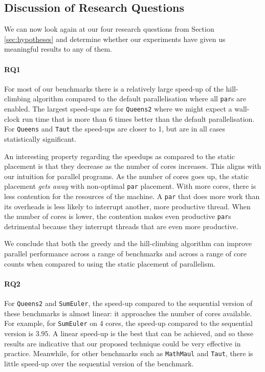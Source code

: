 \subsection{Discussion of Research Questions}

We can now look again at our four research questions from Section
\ref{sec:hypotheses} and determine whether our experiments have given us
meaningful results to any of them.

\paragraph{RQ1}
For most of our benchmarks there is a relatively large speed-up of the
hill-climbing algorithm compared to the default parallelisation where all
\verb-par-s are enabled.  The largest speed-ups are for \verb|Queens2| where we
might expect a wall-clock run time that is more than 6 times better than the
default parallelisation.  For \verb|Queens| and \verb|Taut| the speed-ups are
closer to 1, but are in all cases statistically significant.

An interesting property regarding the speedups as compared to the static
placement is that they decrease as the number of cores increases.  This aligns
with our intuition for parallel programs. As the number of cores goes up, the
static placement \emph{gets away} with non-optimal \verb|par| placement. With
more cores, there is less contention for the resources of the machine. A
\verb|par| that does more work than its overheads is less likely to interrupt
another, more productive thread. When the number of cores is lower, the
contention makes even productive \verb|par|s detrimental because they interrupt
threads that are even more productive.

We conclude that both the greedy and the hill-climbing algorithm can improve
parallel performance across a range of benchmarks and across a range of core
counts when compared to using the static placement of parallelism.

\paragraph{RQ2}
For \verb|Queens2| and \verb|SumEuler|, the speed-up compared to the sequential
version of these benchmarks is almost linear: it approaches the number of cores
available.  For example, for \verb|SumEuler| on 4 cores, the speed-up compared
to the sequential version is $3.95$.  A linear speed-up is the best that can be
achieved, and so these results are indicative that our proposed technique could
be very effective in practice.  Meanwhile, for other benchmarks such as
\verb|MathMaul| and \verb|Taut|, there is little speed-up over the sequential
version of the benchmark.


